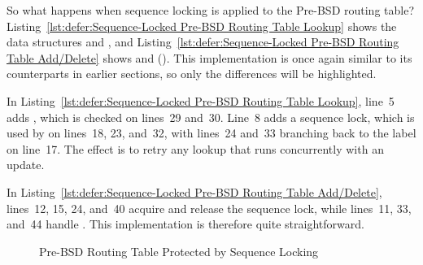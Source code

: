 So what happens when sequence locking is applied to the Pre-BSD
routing table?
Listing~\ref{lst:defer:Sequence-Locked Pre-BSD Routing Table Lookup}
shows the data structures and , and
Listing~\ref{lst:defer:Sequence-Locked Pre-BSD Routing Table Add/Delete}
shows  and  ().
This implementation is once again similar to its counterparts in earlier
sections, so only the differences will be highlighted.

In
Listing~\ref{lst:defer:Sequence-Locked Pre-BSD Routing Table Lookup},
line~5 adds , which is checked on lines~29 and~30.
Line~8 adds a sequence lock, which is used by 
on lines~18, 23, and~32, with lines~24 and~33 branching back to
the  label on line~17.
The effect is to retry any lookup that runs concurrently with an update.

In
Listing~\ref{lst:defer:Sequence-Locked Pre-BSD Routing Table Add/Delete},
lines~12, 15, 24, and~40 acquire and release the sequence lock,
while lines~11, 33, and~44 handle .
This implementation is therefore quite straightforward.

\begin{figure}[tb]
\centering
{}
\caption{Pre-BSD Routing Table Protected by Sequence Locking}
\label{fig:defer:Pre-BSD Routing Table Protected by Sequence Locking}
\end{figure}

